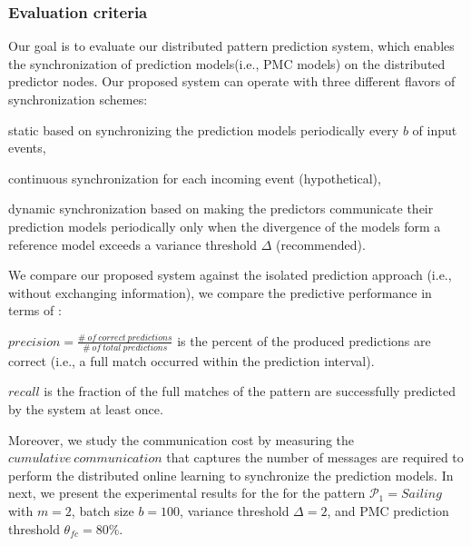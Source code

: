 \subsubsection*{Evaluation criteria} Our goal is to evaluate our distributed pattern prediction system, which enables the synchronization of prediction models(i.e., PMC models) on the distributed predictor nodes. Our proposed system can operate with three different flavors of synchronization schemes: \begin{enumerate*}[label=(\roman*)] 
	\item static based on synchronizing the prediction models periodically every $b$ of input events, 
\item continuous synchronization for each incoming event (hypothetical), 
\item dynamic synchronization based on making the predictors communicate their prediction models periodically only when the divergence of the models form a reference model exceeds a variance threshold $\Delta$ (recommended).
 	   
\end{enumerate*}
We compare our proposed system against the isolated prediction approach (i.e., without exchanging information), we compare the predictive performance in terms of :
\begin{enumerate*}[label=(\roman*)]
	
\item  $\mathit{precision = \frac{\#\ of\ correct\ predictions}{\#\ of\ total\ predictions}}$ is the percent of the produced predictions are correct (i.e., a full match occurred within the prediction interval).   

\item $\mathit{recall}$ is the fraction of the full matches of the pattern are successfully predicted by the system at least once. 

\end{enumerate*} 
\par Moreover, we study the communication cost by measuring the $\mathit{cumulative\ communication}$ that captures the number of messages are required to perform the distributed online learning to synchronize the prediction models. In next, we present the experimental results for the for the pattern  $\mathcal{P}_1=Sailing$ with $m=2$, batch size $b=100$, variance threshold $\Delta=2$, and PMC prediction threshold $\theta_{fc}=80\%$.

